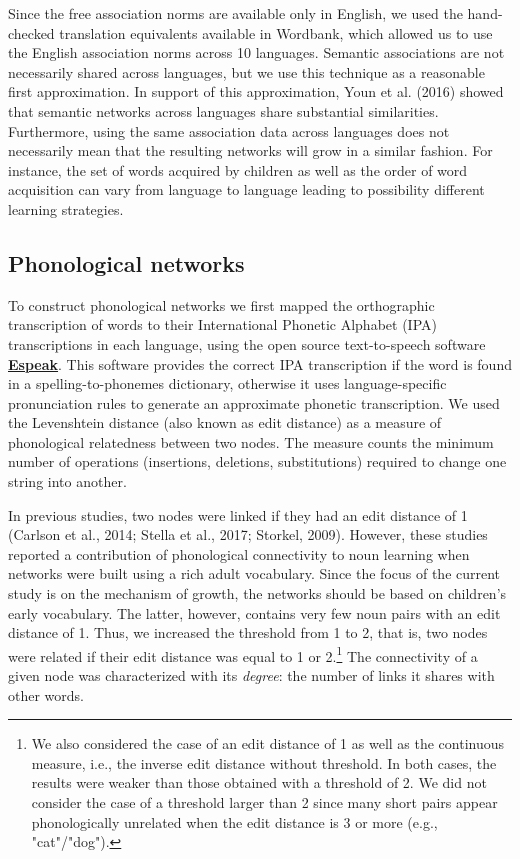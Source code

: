\documentclass[english,floatsintext,man]{apa6}
\theoremstyle{definition}
\theoremstyle{definition}
\theoremstyle{definition}
\theoremstyle{remark}
\begin{document}
Since the free association norms are available only in English, we used
the hand-checked translation equivalents available in Wordbank, which
allowed us to use the English association norms across 10 languages.
Semantic associations are not necessarily shared across languages, but
we use this technique as a reasonable first approximation. In support of
this approximation, Youn et al. (2016) showed that semantic networks
across languages share substantial similarities. Furthermore, using the
same association data across languages does not necessarily mean that
the resulting networks will grow in a similar fashion. For instance, the
set of words acquired by children as well as the order of word
acquisition can vary from language to language leading to possibility
different learning strategies.

\subsection{Phonological networks}\label{phonological-networks}

To construct phonological networks we first mapped the orthographic
transcription of words to their International Phonetic Alphabet (IPA)
transcriptions in each language, using the open source text-to-speech
software \textbf{\href{http://http://espeak.sourceforge.net/}{Espeak}}.
This software provides the correct IPA transcription if the word is
found in a spelling-to-phonemes dictionary, otherwise it uses
language-specific pronunciation rules to generate an approximate
phonetic transcription. We used the Levenshtein distance (also known as
edit distance) as a measure of phonological relatedness between two
nodes. The measure counts the minimum number of operations (insertions,
deletions, substitutions) required to change one string into another.

In previous studies, two nodes were linked if they had an edit distance
of 1 (Carlson et al., 2014; Stella et al., 2017; Storkel, 2009).
However, these studies reported a contribution of phonological
connectivity to noun learning when networks were built using a rich
adult vocabulary. Since the focus of the current study is on the
mechanism of growth, the networks should be based on children's early
vocabulary. The latter, however, contains very few noun pairs with an
edit distance of 1. Thus, we increased the threshold from 1 to 2, that
is, two nodes were related if their edit distance was equal to 1 or
2.\footnote{We also considered the case of an edit distance of 1 as well as the continuous measure, i.e., the inverse edit distance without threshold. In both cases, the results were weaker than those obtained with a threshold of 2. We did not consider the case of a threshold larger than 2 since many short pairs appear phonologically unrelated when the edit distance is 3 or more (e.g., "cat"/"dog").}
The connectivity of a given node was characterized with its
\emph{degree}: the number of links it shares with other words.
\end{document}
